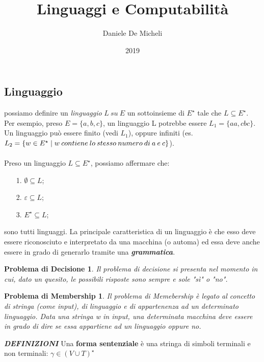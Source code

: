 \documentclass[11pt]{article}
\title{Linguaggi e Computabilità}
\author{Daniele De Micheli}
\date{2019}
\newtheorem*{problemaDecisione}{Problema di Decisione}
\newtheorem*{problemaMembership}{Problema di Membership}
\begin{document}

\subsection{Linguaggio} possiamo definire un \textit{linguaggio} $L \medspace su \medspace E$ un sottoinsieme di $E^{\star}$ tale che $L \subseteq E^{\star}$. Per esempio, preso $E = \{a,b,c\}$, un linguaggio L potrebbe essere $L_{1}=\{aa,cbc\}$. Un linguaggio può essere finito (vedi $L_ {1}$), oppure infiniti (es. $L_{2} = \{ w \in E^{\star} \thickspace | \thickspace w \medspace contiene \medspace lo \medspace stesso \medspace numero \medspace di \medspace a \medspace e \medspace c\}$).
\\ \\
Preso un linguaggio $L \subseteq E^{\star}$, possiamo affermare che:
\begin{itemize}
\item[1.] $ \emptyset \subseteq L$;
\item[2.] $ \varepsilon \subseteq L $;
\item[3.] $ E^{\star} \subseteq L$;
\end{itemize}
sono tutti linguaggi. La principale caratteristica di un linguaggio è che esso deve essere riconosciuto e interpretato da una macchina (o automa) ed essa deve anche essere in grado di generarlo tramite una \textbf{\textit{grammatica}}.
\begin{problemaDecisione}
Il problema di decisione si presenta nel momento in cui, dato un quesito, le possibili risposte sono sempre e sole "sì" o "no".
\end{problemaDecisione}
\begin{problemaMembership}
Il problema di Memebership è legato al concetto di stringa (come input), di linguaggio e di appartenenza ad un determinato linguaggio. Data una stringa w in input, una determinata macchina deve essere in grado di dire se essa appartiene ad un linguaggio oppure no.
\end{problemaMembership}

\textbf{\textit{DEFINIZIONI}}
Una \textbf{forma sentenziale} è una stringa di simboli terminali e non terminali: $\gamma \in (V \cup T)^{\star}$
\end{document}

